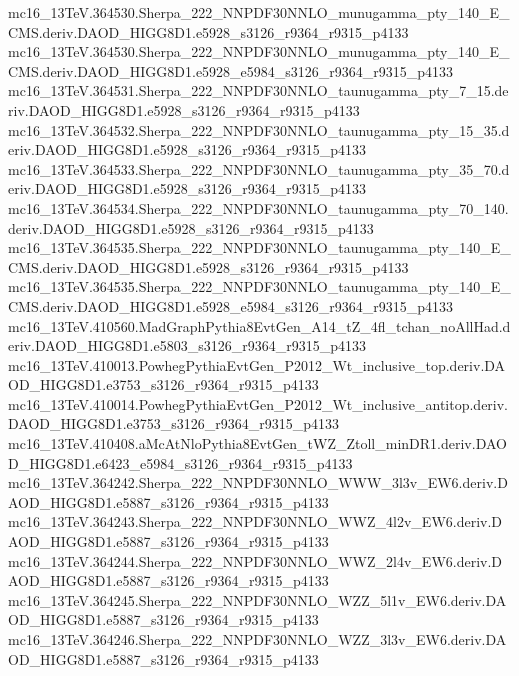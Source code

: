 mc16_13TeV.364530.Sherpa_222_NNPDF30NNLO_munugamma_pty_140_E_CMS.deriv.DAOD_HIGG8D1.e5928_s3126_r9364_r9315_p4133 \\
mc16_13TeV.364530.Sherpa_222_NNPDF30NNLO_munugamma_pty_140_E_CMS.deriv.DAOD_HIGG8D1.e5928_e5984_s3126_r9364_r9315_p4133 \\
mc16_13TeV.364531.Sherpa_222_NNPDF30NNLO_taunugamma_pty_7_15.deriv.DAOD_HIGG8D1.e5928_s3126_r9364_r9315_p4133 \\
mc16_13TeV.364532.Sherpa_222_NNPDF30NNLO_taunugamma_pty_15_35.deriv.DAOD_HIGG8D1.e5928_s3126_r9364_r9315_p4133 \\
mc16_13TeV.364533.Sherpa_222_NNPDF30NNLO_taunugamma_pty_35_70.deriv.DAOD_HIGG8D1.e5928_s3126_r9364_r9315_p4133 \\
mc16_13TeV.364534.Sherpa_222_NNPDF30NNLO_taunugamma_pty_70_140.deriv.DAOD_HIGG8D1.e5928_s3126_r9364_r9315_p4133 \\
mc16_13TeV.364535.Sherpa_222_NNPDF30NNLO_taunugamma_pty_140_E_CMS.deriv.DAOD_HIGG8D1.e5928_s3126_r9364_r9315_p4133 \\
mc16_13TeV.364535.Sherpa_222_NNPDF30NNLO_taunugamma_pty_140_E_CMS.deriv.DAOD_HIGG8D1.e5928_e5984_s3126_r9364_r9315_p4133 \\
mc16_13TeV.410560.MadGraphPythia8EvtGen_A14_tZ_4fl_tchan_noAllHad.deriv.DAOD_HIGG8D1.e5803_s3126_r9364_r9315_p4133 \\
mc16_13TeV.410013.PowhegPythiaEvtGen_P2012_Wt_inclusive_top.deriv.DAOD_HIGG8D1.e3753_s3126_r9364_r9315_p4133 \\
mc16_13TeV.410014.PowhegPythiaEvtGen_P2012_Wt_inclusive_antitop.deriv.DAOD_HIGG8D1.e3753_s3126_r9364_r9315_p4133 \\
mc16_13TeV.410408.aMcAtNloPythia8EvtGen_tWZ_Ztoll_minDR1.deriv.DAOD_HIGG8D1.e6423_e5984_s3126_r9364_r9315_p4133 \\
mc16_13TeV.364242.Sherpa_222_NNPDF30NNLO_WWW_3l3v_EW6.deriv.DAOD_HIGG8D1.e5887_s3126_r9364_r9315_p4133 \\
mc16_13TeV.364243.Sherpa_222_NNPDF30NNLO_WWZ_4l2v_EW6.deriv.DAOD_HIGG8D1.e5887_s3126_r9364_r9315_p4133 \\
mc16_13TeV.364244.Sherpa_222_NNPDF30NNLO_WWZ_2l4v_EW6.deriv.DAOD_HIGG8D1.e5887_s3126_r9364_r9315_p4133 \\
mc16_13TeV.364245.Sherpa_222_NNPDF30NNLO_WZZ_5l1v_EW6.deriv.DAOD_HIGG8D1.e5887_s3126_r9364_r9315_p4133 \\
mc16_13TeV.364246.Sherpa_222_NNPDF30NNLO_WZZ_3l3v_EW6.deriv.DAOD_HIGG8D1.e5887_s3126_r9364_r9315_p4133 \\
